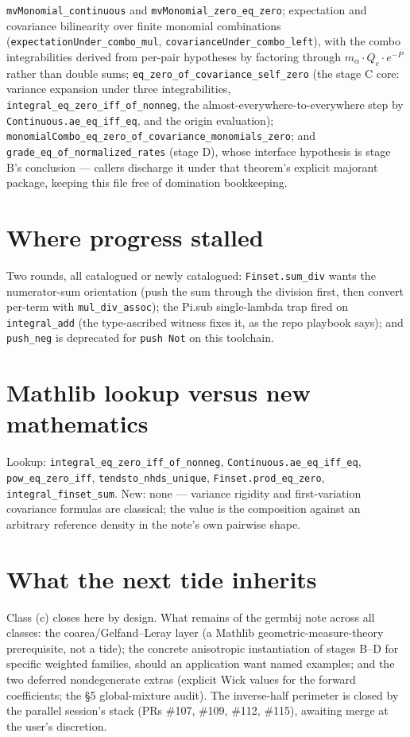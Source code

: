 \documentclass[11pt]{article}
\newcommand{\code}[1]{\texttt{#1}}
\begin{document}
\begin{sloppypar}
\code{mvMonomial\_continuous} and \code{mvMonomial\_zero\_eq\_zero};
expectation and covariance bilinearity over finite monomial
combinations (\code{expectationUnder\_combo\_mul},
\code{covarianceUnder\_combo\_left}), with the combo integrabilities
derived from per-pair hypotheses by factoring through
$m_\alpha \cdot Q_c \cdot e^{-P}$ rather than double sums;
\code{eq\_zero\_of\_covariance\_self\_zero} (the stage C core:
variance expansion under three integrabilities,
\code{integral\_eq\_zero\_iff\_of\_nonneg}, the
almost-everywhere-to-everywhere step by
\code{Continuous.ae\_eq\_iff\_eq}, and the origin evaluation);
\code{monomialCombo\_eq\_zero\_of\_covariance\_monomials\_zero}; and
\code{grade\_eq\_of\_normalized\_rates} (stage D), whose interface
hypothesis is stage B's conclusion --- callers discharge it under
that theorem's explicit majorant package, keeping this file free of
domination bookkeeping.
\end{sloppypar}

\section{Where progress stalled}

Two rounds, all catalogued or newly catalogued:
\code{Finset.sum\_div} wants the numerator-sum orientation (push the
sum through the division first, then convert per-term with
\code{mul\_div\_assoc}); the Pi.sub single-lambda trap fired on
\code{integral\_add} (the type-ascribed witness fixes it, as the
repo playbook says); and \code{push\_neg} is deprecated for
\code{push Not} on this toolchain.

\section{Mathlib lookup versus new mathematics}

\begin{sloppypar}
Lookup: \code{integral\_eq\_zero\_iff\_of\_nonneg},
\code{Continuous.ae\_eq\_iff\_eq}, \code{pow\_eq\_zero\_iff},
\code{tendsto\_nhds\_unique}, \code{Finset.prod\_eq\_zero},
\code{integral\_finset\_sum}. New: none --- variance rigidity and
first-variation covariance formulas are classical; the value is the
composition against an arbitrary reference density in the note's own
pairwise shape.
\end{sloppypar}

\section{What the next tide inherits}

Class (c) closes here by design. What remains of the germbij note
across all classes: the coarea/Gelfand--Leray layer (a Mathlib
geometric-measure-theory prerequisite, not a tide); the concrete
anisotropic instantiation of stages B--D for specific weighted
families, should an application want named examples; and the two
deferred nondegenerate extras (explicit Wick values for the forward
coefficients; the \S5 global-mixture audit). The inverse-half
perimeter is closed by the parallel session's stack (PRs \#107,
\#109, \#112, \#115), awaiting merge at the user's discretion.
\end{document}
